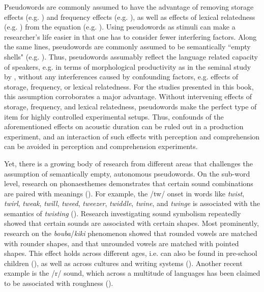 Pseudowords are commonly assumed to have the advantage of removing storage effects (e.g. \cite{Caselli2016}) and frequency effects (e.g. \cite{Gahl2008, Lohmann2018}), as well as effects of lexical relatedness (e.g. \cite{Schriefers1998}) from the equation (e.g. \cite{Turcsan2015}). Using pseudowords as stimuli can make a researcher’s life easier in that one has to consider fewer interfering factors. Along the same lines, pseudowords are commonly assumed to be semantically ``empty shells" (e.g. \cite{Guenther1983, Frisch2000, Turcsan2015}). Thus, pseudowords assumably reflect the language related capacity of speakers, e.g. in terms of morphological productivity as in the seminal study by \citet{Berko1958}, without any interferences caused by confounding factors, e.g. effects of storage, frequency, or lexical relatedness. For the studies presented in this book, this assumption corroborates a major advantage. Without intervening effects of storage, frequency, and lexical relatedness, pseudowords make the perfect type of item for highly controlled experimental setups. Thus, confounds of the aforementioned effects on acoustic duration can be ruled out in a production experiment, and an interaction of such effects with perception and comprehension can be avoided in perception and comprehension experiments.

Yet, there is a growing body of research from different areas that challenges the assumption of semantically empty, autonomous pseudowords. On the sub-word level, research on phonaesthemes demonstrates that certain sound combinations are paired with meanings (\cite{Bergen2004, Kwon2015}). For example, the /tw/ onset in words like \textit{twist}, \textit{twirl}, \textit{tweak}, \textit{twill}, \textit{tweed}, \textit{tweezer}, \textit{twiddle}, \textit{twine}, and \textit{twinge} is associated with the semantics of \textit{twisting} (\cite{Bolinger1950}). Research investigating sound symbolism repeatedly showed that certain sounds are associated with certain shapes. Most prominently, research on the \textit{bouba}/\textit{kiki} phenomenon showed that rounded vowels are matched with rounder shapes, and that unrounded vowels are matched with pointed shapes. This effect holds across different ages, i.e. can also be found in pre-school children (\cite{Maurer2006}), as well as across cultures and writing systems (\cite{Cwiek2022}). Another recent example is the /r/ sound, which across a multitude of languages has been claimed to be associated with roughness (\cite{Winter2022}).

